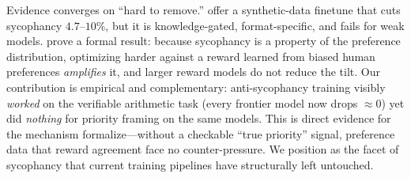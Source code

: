  Evidence converges on ``hard to remove.''
\citet{wei2023simple} offer a synthetic-data finetune that cuts sycophancy $4.7$--$10\%$,
but it is knowledge-gated, format-specific, and fails for weak models.
\citet{shapira2026rlhf} prove a formal result: because sycophancy is a property of the
preference distribution, optimizing harder against a reward learned from biased human
preferences \emph{amplifies} it, and larger reward models do not reduce the tilt. Our
contribution is empirical and complementary: anti-sycophancy training visibly \emph{worked}
on the verifiable arithmetic task (every frontier model now drops $\approx 0$) yet did
\emph{nothing} for priority framing on the same models. This is direct evidence for the
mechanism \citet{shapira2026rlhf} formalize---without a checkable ``true priority'' signal,
preference data that reward agreement face no counter-pressure. We position \prioritysyco as
the facet of sycophancy that current training pipelines have structurally left untouched.
